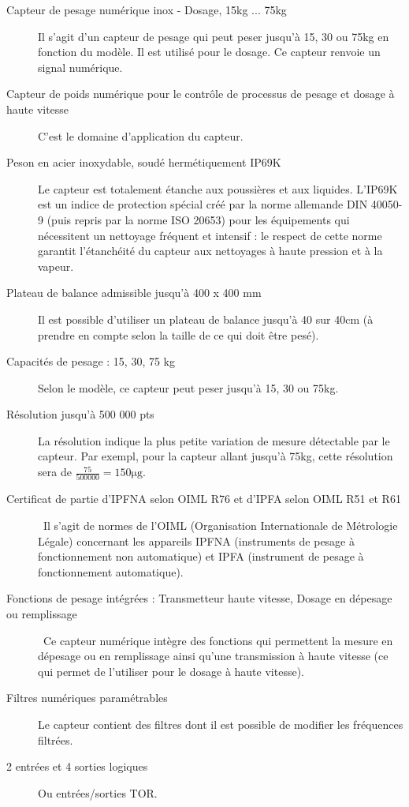 \documentclass{article}
\begin{document}
\begin{description}
    \item[Capteur de pesage numérique inox - Dosage, 15kg ... 75kg] Il s'agit d'un capteur de pesage qui peut peser jusqu'à 15, 30 ou 75kg en fonction du modèle. Il est utilisé pour le dosage. Ce capteur renvoie un signal numérique.
    \item[Capteur de poids numérique pour le contrôle de processus de pesage et dosage à haute vitesse] C'est le domaine d'application du capteur.
    \item[Peson en acier inoxydable, soudé hermétiquement IP69K] Le capteur est totalement étanche aux poussières et aux liquides. L'IP69K est un indice de protection spécial créé par la norme allemande DIN 40050-9 (puis repris par la norme ISO 20653) pour les équipements qui nécessitent un nettoyage fréquent et intensif : le respect de cette norme garantit l'étanchéité du capteur aux nettoyages à haute pression et à la vapeur.
    \item[Plateau de balance admissible jusqu'à 400 x 400 mm] Il est possible d'utiliser un plateau de balance jusqu'à 40 sur 40cm (à prendre en compte selon la taille de ce qui doit être pesé).
    \item[Capacités de pesage : 15, 30, 75 kg] Selon le modèle, ce capteur peut peser jusqu'à 15, 30 ou 75kg.
    \item[Résolution jusqu'à 500 000 pts] La résolution indique la plus petite variation de mesure détectable par le capteur. Par exempl, pour la capteur allant jusqu'à 75kg, cette résolution sera de $\frac{75}{500000} = 150\si{\micro\gram}$.
    \item[Certificat de partie d'IPFNA selon OIML R76 et d'IPFA selon OIML R51 et R61]\ Il s'agit de normes de l'OIML (Organisation Internationale de Métrologie Légale) concernant les appareils IPFNA (instruments de pesage à fonctionnement non automatique) et IPFA (instrument de pesage à fonctionnement automatique).
    \item[Fonctions de pesage intégrées : Transmetteur haute vitesse, Dosage en dépesage ou remplissage]\ Ce capteur numérique intègre des fonctions qui permettent la mesure en dépesage ou en remplissage ainsi qu'une transmission à haute vitesse (ce qui permet de l'utiliser pour le dosage à haute vitesse).
    \item[Filtres numériques paramétrables] Le capteur contient des filtres dont il est possible de modifier les fréquences filtrées.
    \item[2 entrées et 4 sorties logiques] Ou entrées/sorties TOR.

\end{description}
\end{document}
